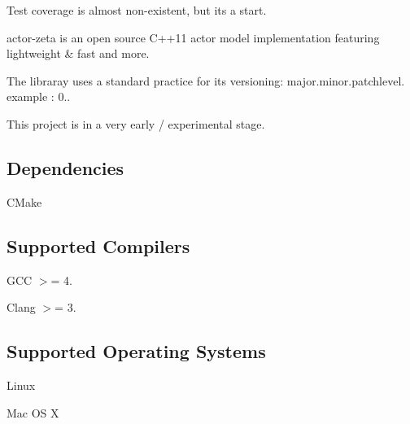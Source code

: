 Test coverage is almost non-\/existent, but it\textquotesingle{}s a start.

actor-\/zeta is an open source C++11 actor model implementation featuring lightweight \& fast and more.

The libraray uses a standard practice for its versioning\+: major.\+minor.\+patchlevel. example \+: 0..

This project is in a very early / experimental stage.

\subsection*{Dependencies}


\begin{DoxyItemize}
\item C\+Make
\end{DoxyItemize}

\subsection*{Supported Compilers}


\begin{DoxyItemize}
\item G\+CC $>$= 4.
\item Clang $>$= 3.
\end{DoxyItemize}

\subsection*{Supported Operating Systems}


\begin{DoxyItemize}
\item Linux
\item Mac OS X 
\end{DoxyItemize}